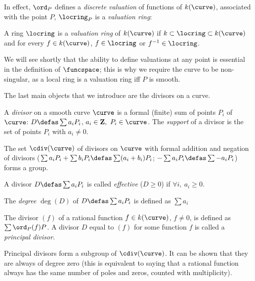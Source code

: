 In effect, $\ord_P$ defines a \emph{discrete valuation} of functions of $k(\curve)$, associated with the point $P$, \ie $\locring_P$ is a \emph{valuation ring}:

\begin{defi}
A ring $\locring$ is a \emph{valuation ring} of $k(\curve)$ if $k \subset \locring \subset k(\curve)$  and for every $f \in k(\curve)$,
$f \in \locring$ or $f^{-1} \in \locring$.
\end{defi}

We will see shortly that the ability to define valuations at any point is essential
in the definition of $\funcspace$; this is why we require the curve to be non-singular, as a local ring is a valuation ring iff $P$ is smooth.

\medskip

The last main objects that we introduce are the divisors on a curve.

\begin{defi}[Divisor]
A \emph{divisor} on a smooth curve $\curve$ is a formal (finite) sum of points $P_i$ of $\curve$: $D \defas \sum a_iP_i$, $a_i \in \mathbf{Z},~P_i \in \curve$.
The \emph{support} of a divisor is the set of points $P_i$ with $a_i \neq 0$.

\noindent
The set $\cdiv(\curve)$ of divisors on $\curve$ with formal addition and negation of divisors ($\sum a_iP_i + \sum b_iP_i \defas \sum (a_i+b_i)P_i$;
$-\sum a_iP_i \defas \sum -a_iP_i$) forms a group.

\noindent
A divisor $D \defas \sum a_iP_i$ is called \emph{effective} ($D \geq 0$) if $\forall i,~a_i \geq 0$.

\noindent
The \emph{degree} $\deg(D)$ of $D \defas \sum a_iP_i$ is defined as $\sum a_i$
\end{defi}

\begin{defi}
The divisor $(f)$ of a rational function $f \in k(\curve)$, $f \neq 0$, is defined as $\sum \ord_P(f)P$.
A divisor $D$ equal to $(f)$ for some function $f$ is called a \emph{principal divisor}.
\end{defi}

Principal divisors form a subgroup of $\cdiv(\curve)$. It can be shown that they are always of degree zero
(this is equivalent to saying that a rational function always has the same number of poles and zeros, counted with
multiplicity).

